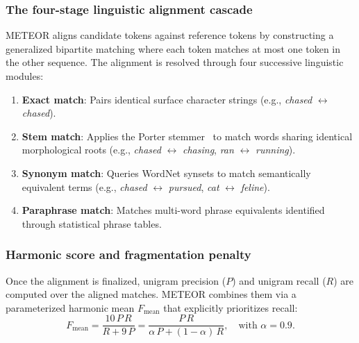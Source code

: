 \documentclass[../../main.tex]{subfiles}
\begin{document}
\subsubsection{The four-stage linguistic alignment cascade}
METEOR aligns candidate tokens against reference tokens by constructing a generalized bipartite matching where each token matches at most one token in the other sequence. The alignment is resolved through four successive linguistic modules:
\begin{enumerate}
    \item \textbf{Exact match}: Pairs identical surface character strings (e.g., \textit{chased} $\leftrightarrow$ \textit{chased}).
    \item \textbf{Stem match}: Applies the Porter stemmer~\cite{banerjee2005meteor} to match words sharing identical morphological roots (e.g., \textit{chased} $\leftrightarrow$ \textit{chasing}, \textit{ran} $\leftrightarrow$ \textit{running}).
    \item \textbf{Synonym match}: Queries WordNet synsets to match semantically equivalent terms (e.g., \textit{chased} $\leftrightarrow$ \textit{pursued}, \textit{cat} $\leftrightarrow$ \textit{feline}).
    \item \textbf{Paraphrase match}: Matches multi-word phrase equivalents identified through statistical phrase tables.
\end{enumerate}

\subsubsection{Harmonic score and fragmentation penalty}
Once the alignment is finalized, unigram precision ($P$) and unigram recall ($R$) are computed over the aligned matches. METEOR combines them via a parameterized harmonic mean $F_{\text{mean}}$ that explicitly prioritizes recall:
\begin{equation}
\label{eq:meteor_fmean}
F_{\text{mean}} = \frac{10 \, P \, R}{R + 9 \, P} = \frac{P \, R}{\alpha \, P + (1 - \alpha) \, R}, \quad \text{with } \alpha = 0.9.
\end{equation}
\end{document}
